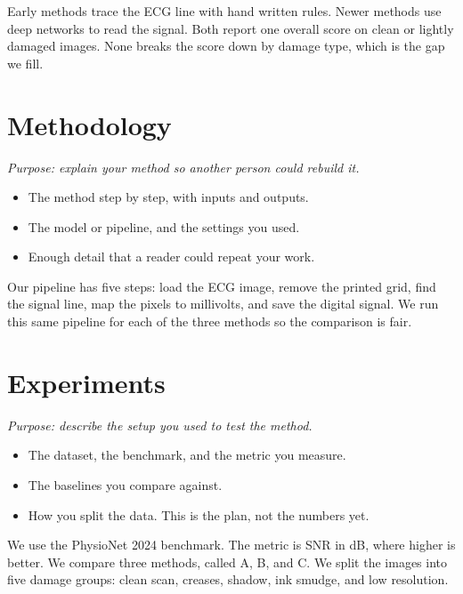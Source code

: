 \documentclass[11pt]{article}
\begin{document}

\textcolor{cMethod}{Early methods trace the ECG line with hand written rules.} \textcolor{cMethod}{Newer methods use deep networks to read the signal.} Both report one overall score on clean or lightly damaged images. \textcolor{cGap}{None breaks the score down by damage type, which is the gap we fill.}

\section{Methodology}
\textit{Purpose: explain your method so another person could rebuild it.}

\begin{itemize}
\item The \textcolor{cMethod}{method} step by step, with inputs and outputs.
\item The model or pipeline, and the settings you used.
\item Enough detail that a reader could repeat your work.
\end{itemize}


\textcolor{cMethod}{Our pipeline has five steps: load the ECG image, remove the printed grid, find the signal line, map the pixels to millivolts, and save the digital signal.} We run this same pipeline for each of the three methods so the comparison is fair.

\section{Experiments}
\textit{Purpose: describe the setup you used to test the method.}

\begin{itemize}
\item The dataset, the benchmark, and the \textcolor{cResult}{metric} you measure.
\item The baselines you compare against.
\item How you split the data. This is the plan, not the numbers yet.
\end{itemize}


We use the PhysioNet 2024 benchmark. The metric is \textcolor{cResult}{SNR in dB}, where higher is better. We compare three methods, called A, B, and C. We split the images into five damage groups: clean scan, creases, shadow, ink smudge, and low resolution.
\end{document}

